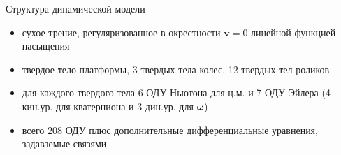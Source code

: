\documentclass{beamer}
\begin{document}
\begin{frame}{Структура динамической модели}
    \begin{itemize}
        \item сухое трение, регуляризованное в окрестности $\mathbf{v} = 0$ линейной функцией насыщения
        \item твердое тело платформы, 3 твердых тела колес, 12 твердых тел роликов
        \item для каждого твердого тела 6 ОДУ Ньютона для ц.м. и 7 ОДУ Эйлера (4 кин.ур. для кватерниона и 3 дин.ур. для $\mathbf{\omega}$)
        \item всего $208$ ОДУ плюс дополнительные дифференциальные уравнения, задаваемые связями
    \end{itemize}
\end{frame}
\end{document}
